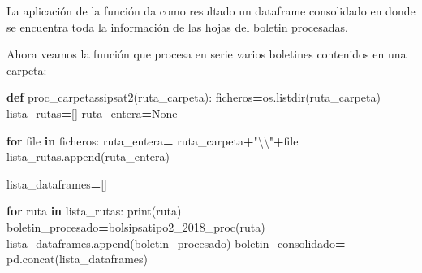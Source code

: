 \documentclass[
]{book}
\newenvironment{Shaded}{\begin{snugshade}}{\end{snugshade}}
\newcommand{\BuiltInTok}[1]{#1}
\newcommand{\CharTok}[1]{\textcolor[rgb]{0.31,0.60,0.02}{#1}}
\newcommand{\ControlFlowTok}[1]{\textcolor[rgb]{0.13,0.29,0.53}{\textbf{#1}}}
\newcommand{\KeywordTok}[1]{\textcolor[rgb]{0.13,0.29,0.53}{\textbf{#1}}}
\newcommand{\NormalTok}[1]{#1}
\newcommand{\OperatorTok}[1]{\textcolor[rgb]{0.81,0.36,0.00}{\textbf{#1}}}
\newcommand{\StringTok}[1]{\textcolor[rgb]{0.31,0.60,0.02}{#1}}
\newcommand{\VariableTok}[1]{\textcolor[rgb]{0.00,0.00,0.00}{#1}}
\begin{document}
La aplicación de la función da como resultado un dataframe consolidado en donde se encuentra toda la información de las hojas del boletin procesadas.

Ahora veamos la función que procesa en serie varios boletines contenidos en una carpeta:

\begin{Shaded}
\begin{Highlighting}[]

\KeywordTok{def}\NormalTok{ proc\_carpetassipsat2(ruta\_carpeta):}
\NormalTok{    ficheros}\OperatorTok{=}\NormalTok{os.listdir(ruta\_carpeta)}
\NormalTok{    lista\_rutas}\OperatorTok{=}\NormalTok{[]}
\NormalTok{    ruta\_entera}\OperatorTok{=}\VariableTok{None}
    
    \ControlFlowTok{for} \BuiltInTok{file} \KeywordTok{in}\NormalTok{ ficheros:}
\NormalTok{        ruta\_entera}\OperatorTok{=}\NormalTok{ ruta\_carpeta}\OperatorTok{+}\StringTok{"}\CharTok{\textbackslash{}\textbackslash{}}\StringTok{"}\OperatorTok{+}\BuiltInTok{file}
\NormalTok{        lista\_rutas.append(ruta\_entera)}
    
\NormalTok{    lista\_dataframes}\OperatorTok{=}\NormalTok{[]}
    
    \ControlFlowTok{for}\NormalTok{ ruta }\KeywordTok{in}\NormalTok{ lista\_rutas:}
        \BuiltInTok{print}\NormalTok{(ruta)}
\NormalTok{        boletin\_procesado}\OperatorTok{=}\NormalTok{bolsipsatipo2\_2018\_proc(ruta)}
\NormalTok{        lista\_dataframes.append(boletin\_procesado)}
\NormalTok{        boletin\_consolidado}\OperatorTok{=}\NormalTok{ pd.concat(lista\_dataframes)}
        

\end{Highlighting}
\end{Shaded}
\end{document}
